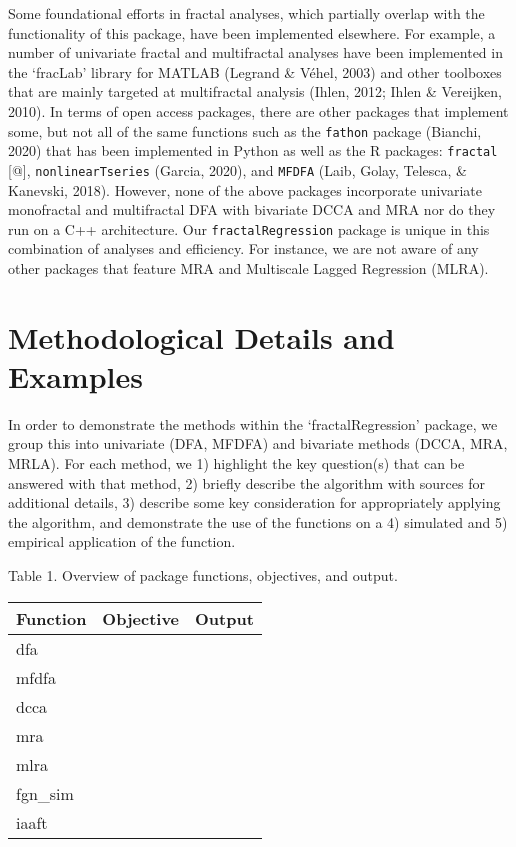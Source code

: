 \documentclass[
  english,
  man]{apa6}
\begin{document}
Some foundational efforts in fractal analyses, which partially overlap
with the functionality of this package, have been implemented elsewhere.
For example, a number of univariate fractal and multifractal analyses
have been implemented in the `fracLab' library for MATLAB (Legrand \& Véhel, 2003)
and other toolboxes that are mainly targeted at multifractal analysis
(Ihlen, 2012; Ihlen \& Vereijken, 2010). In terms of
open access packages, there are other packages that implement some, but
not all of the same functions such as the \texttt{fathon} package
(Bianchi, 2020) that has been implemented in Python as well as the R
packages: \texttt{fractal} {[}@{]}, \texttt{nonlinearTseries}
(Garcia, 2020), and \texttt{MFDFA}
(Laib, Golay, Telesca, \& Kanevski, 2018). However, none of the above packages
incorporate univariate monofractal and multifractal DFA with bivariate
DCCA and MRA nor do they run on a C++ architecture. Our
\texttt{fractalRegression} package is unique in this combination of analyses
and efficiency. For instance, we are not aware of any other packages
that feature MRA and Multiscale Lagged Regression (MLRA).

\hypertarget{methodological-details-and-examples}{%
\section{Methodological Details and Examples}\label{methodological-details-and-examples}}

In order to demonstrate the methods within the `fractalRegression'
package, we group this into univariate (DFA, MFDFA) and bivariate
methods (DCCA, MRA, MRLA). For each method, we 1) highlight the key
question(s) that can be answered with that method, 2) briefly describe
the algorithm with sources for additional details, 3) describe some key
consideration for appropriately applying the algorithm, and demonstrate
the use of the functions on a 4) simulated and 5) empirical application
of the function.

Table 1. Overview of package functions, objectives, and output.

\begin{longtable}[]{@{}lll@{}}
\toprule
Function & Objective & Output \\
\midrule
\endhead
dfa & & \\
mfdfa & & \\
dcca & & \\
mra & & \\
mlra & & \\
fgn\_sim & & \\
iaaft & & \\
\bottomrule
\end{longtable}
\end{document}
